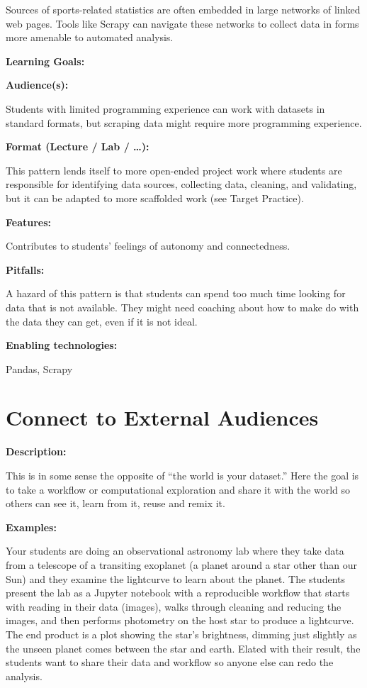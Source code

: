 \documentclass[]{book}
\begin{document}
Sources of sports-related statistics are often embedded in large
networks of linked web pages. Tools like Scrapy can navigate these
networks to collect data in forms more amenable to automated analysis.

\textbf{Learning Goals:}

\textbf{Audience(s):}

Students with limited programming experience can work with datasets in
standard formats, but scraping data might require more programming
experience.

\textbf{Format (Lecture / Lab / \ldots{}):}

This pattern lends itself to more open-ended project work where students
are responsible for identifying data sources, collecting data, cleaning,
and validating, but it can be adapted to more scaffolded work (see
Target Practice).

\textbf{Features:}

Contributes to students' feelings of autonomy and connectedness.

\textbf{Pitfalls:}

A hazard of this pattern is that students can spend too much time
looking for data that is not available. They might need coaching about
how to make do with the data they can get, even if it is not ideal.

\textbf{Enabling technologies:}

Pandas, Scrapy

\section{Connect to External
Audiences}\label{connect-to-external-audiences}

\textbf{Description:}

This is in some sense the opposite of ``the world is your dataset.''
Here the goal is to take a workflow or computational exploration and
share it with the world so others can see it, learn from it, reuse and
remix it.

\textbf{Examples:}

Your students are doing an observational astronomy lab where they take
data from a telescope of a transiting exoplanet (a planet around a star
other than our Sun) and they examine the lightcurve to learn about the
planet. The students present the lab as a Jupyter notebook with a
reproducible workflow that starts with reading in their data (images),
walks through cleaning and reducing the images, and then performs
photometry on the host star to produce a lightcurve. The end product is
a plot showing the star's brightness, dimming just slightly as the
unseen planet comes between the star and earth. Elated with their
result, the students want to share their data and workflow so anyone
else can redo the analysis.
\end{document}
